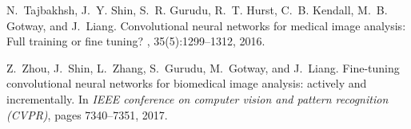\documentclass[zihao=-4,a4paper]{ctexart}
\numberwithin{equation}{section}  %
\numberwithin{table}{section}     %
\numberwithin{figure}{section}    %
\begin{document}
\begin{thebibliography}{10}
N.~Tajbakhsh, J.~Y. Shin, S.~R. Gurudu, R.~T. Hurst, C.~B. Kendall, M.~B.
  Gotway, and J.~Liang.
\newblock Convolutional neural networks for medical image analysis: Full
  training or fine tuning?
, 35(5):1299--1312, 2016.

Z.~Zhou, J.~Shin, L.~Zhang, S.~Gurudu, M.~Gotway, and J.~Liang.
\newblock Fine-tuning convolutional neural networks for biomedical image
  analysis: actively and incrementally.
\newblock In {\em IEEE conference on computer vision and pattern recognition
  (CVPR)}, pages 7340--7351, 2017.

\end{thebibliography}

\clearpage                                     %


\end{document}
